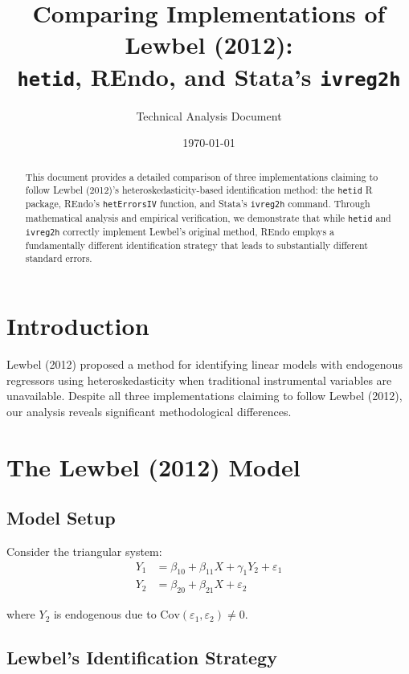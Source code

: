 \documentclass[12pt]{article}
\title{Comparing Implementations of Lewbel (2012):\\
\texttt{hetid}, REndo, and Stata's \texttt{ivreg2h}}
\author{Technical Analysis Document}
\date{\today}
\begin{document}
\maketitle

\begin{abstract}
This document provides a detailed comparison of three implementations claiming to follow Lewbel (2012)'s heteroskedasticity-based identification method: the \texttt{hetid} R package, REndo's \texttt{hetErrorsIV} function, and Stata's \texttt{ivreg2h} command. Through mathematical analysis and empirical verification, we demonstrate that while \texttt{hetid} and \texttt{ivreg2h} correctly implement Lewbel's original method, REndo employs a fundamentally different identification strategy that leads to substantially different standard errors.
\end{abstract}

\section{Introduction}

Lewbel (2012) proposed a method for identifying linear models with endogenous regressors using heteroskedasticity when traditional instrumental variables are unavailable. Despite all three implementations claiming to follow Lewbel (2012), our analysis reveals significant methodological differences.

\section{The Lewbel (2012) Model}

\subsection{Model Setup}

Consider the triangular system:
\begin{align}
Y_1 &= \beta_{10} + \beta_{11}X + \gamma_1 Y_2 + \varepsilon_1 \label{eq:structural}\\
Y_2 &= \beta_{20} + \beta_{21}X + \varepsilon_2 \label{eq:first-stage}
\end{align}

where $Y_2$ is endogenous due to $\text{Cov}(\varepsilon_1, \varepsilon_2) \neq 0$.

\subsection{Lewbel's Identification Strategy}
\end{document}
